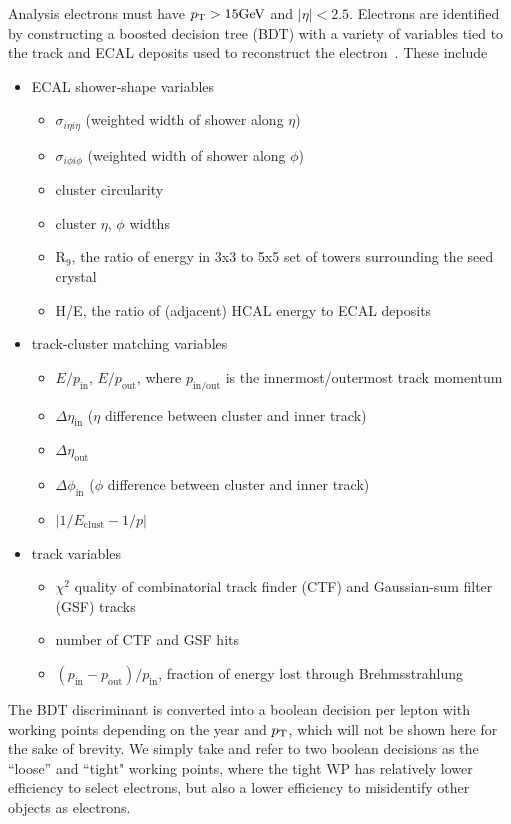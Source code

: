 Analysis electrons must have $p_{\mathrm{T}}>15\text{GeV}$ and $|\eta|<2.5$.
Electrons are identified by constructing a boosted decision tree (BDT) with
a variety of variables tied to the track
and ECAL deposits used to reconstruct the electron~\cite{CMS:Khachatryan2015hwa}.
These include 
\begin{itemize}
    \item ECAL shower-shape variables
    \begin{itemize}
    \item $\sigma_{i\eta i\eta}$ (weighted width of shower along $\eta$)
    \item $\sigma_{i\phi i\phi}$ (weighted width of shower along $\phi$)
    \item cluster circularity
    \item cluster $\eta$, $\phi$ widths
    \item $\mathrm{R_9}$, the ratio of energy in 3x3 to 5x5 set of towers surrounding the seed crystal
    \item H/E, the ratio of (adjacent) HCAL energy to ECAL deposits
    \end{itemize}
    \item track-cluster matching variables
    \begin{itemize}
    \item $E/p_\mathrm{in}$, $E/p_\mathrm{out}$, where $p_\mathrm{in/out}$ is the innermost/outermost track momentum
    \item $\Delta \eta_\mathrm{in}$ ($\eta$ difference between cluster and inner track)
    \item $\Delta \eta_\mathrm{out}$
    \item $\Delta \phi_\mathrm{in}$ ($\phi$ difference between cluster and inner track)
    \item $|1/E_\mathrm{clust} - 1/p|$
    \end{itemize}
    \item track variables
    \begin{itemize}
    \item $\chi^2$ quality of combinatorial track finder (CTF) and Gaussian-sum filter (GSF) tracks
    \item number of CTF and GSF hits
    \item $(p_\mathrm{in}-p_\mathrm{out})/p_\mathrm{in}$, fraction of energy lost through Brehmsstrahlung
    \end{itemize}
\end{itemize}

The BDT discriminant is converted into a boolean decision per lepton with
working points depending on the year and $p_{\mathrm{T}}$, which will not be shown here 
for the sake of brevity. We simply take and refer to two boolean decisions
as the ``loose'' and ``tight" working points, where the tight WP has
relatively lower efficiency to select electrons,
but also a lower efficiency to misidentify
other objects as electrons.

